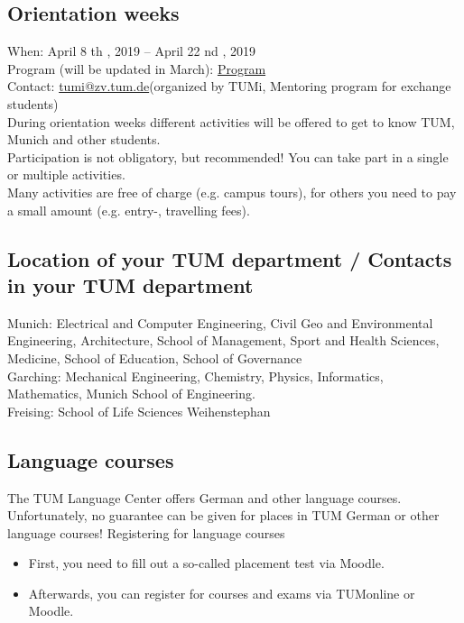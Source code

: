 \documentclass[oneside,final]{book}
\begin{document}
\subsection{Orientation weeks}
When: April 8 th , 2019 – April 22 nd , 2019 \\
Program (will be updated in March): \href{http://www.international.tum.de/en/coming-to-tum/tumi/}{Program} \\
Contact: \href{mailto:tumi@zv.tum.de}{tumi@zv.tum.de}(organized by TUMi, Mentoring program for exchange students) \\
During orientation weeks different activities will be offered to get to know TUM, Munich and other students. \\
Participation is not obligatory, but recommended! You can take part in a single or multiple activities. \\
Many activities are free of charge (e.g. campus tours), for others you need to pay a small amount (e.g.
entry-, travelling fees).


\subsection{Location of your TUM department / Contacts in your TUM department}
Munich: Electrical and Computer Engineering, Civil Geo and Environmental Engineering, Architecture,
School of Management, Sport and Health Sciences, Medicine, School of Education, School of Governance \\
Garching: Mechanical Engineering, Chemistry, Physics, Informatics, Mathematics, Munich School of
Engineering. \\
Freising: School of Life Sciences Weihenstephan



\subsection{Language courses}
The TUM Language Center offers German and other language courses. Unfortunately, no guarantee
can be given for places in TUM German or other language courses!
Registering for language courses
\begin{itemize}
  \item First, you need to fill out a so-called placement test via Moodle.
  \item Afterwards, you can register for courses and exams via TUMonline or Moodle.
\end{itemize}
\end{document}
